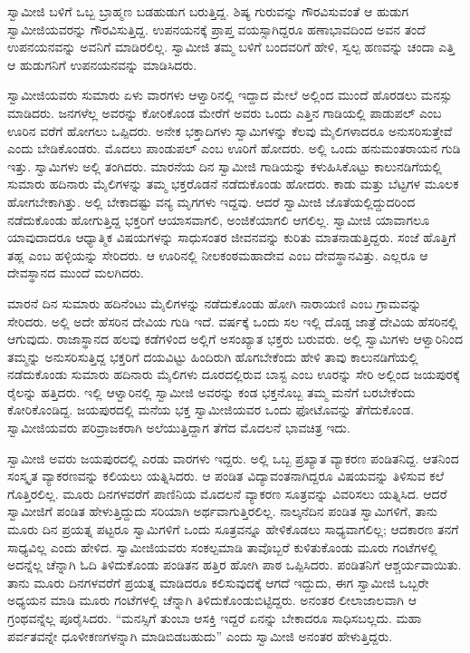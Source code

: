  ಸ್ವಾಮೀಜಿ ಬಳಿಗೆ ಒಬ್ಬ ಬ್ರಾಹ್ಮಣ ಬಡಹುಡುಗ ಬರುತ್ತಿದ್ದ. ಶಿಷ್ಯ ಗುರುವನ್ನು ಗೌರವಿಸುವಂತೆ ಆ ಹುಡುಗ ಸ್ವಾಮೀಜಿಯವರನ್ನು ಗೌರವಿಸುತ್ತಿದ್ದ. ಉಪನಯನಕ್ಕೆ ಪ್ರಾಪ್ತ ವಯಸ್ಸಾಗಿದ್ದರೂ ಹಣಾಭಾವದಿಂದ ಅವನ ತಂದೆ ಉಪನಯನವನ್ನು ಅವನಿಗೆ ಮಾಡಿರಲಿಲ್ಲ. ಸ್ವಾಮೀಜಿ ತಮ್ಮ ಬಳಿಗೆ ಬಂದವರಿಗೆ ಹೇಳಿ, ಸ್ವಲ್ಪ ಹಣವನ್ನು ಚಂದಾ ಎತ್ತಿ ಆ ಹುಡುಗನಿಗೆ ಉಪನಯನವನ್ನು ಮಾಡಿಸಿದರು. 

 ಸ್ವಾಮೀಜಿಯವರು ಸುಮಾರು ಏಳು ವಾರಗಳು ಆಳ್ವಾರಿನಲ್ಲಿ ಇದ್ದಾದ ಮೇಲೆ ಅಲ್ಲಿಂದ ಮುಂದೆ ಹೊರಡಲು ಮನಸ್ಸು ಮಾಡಿದರು. ಜನಗಳೆಲ್ಲ ಅವರನ್ನು ಕೋರಿಕೊಂಡ ಮೇರೆಗೆ ಅವರು ಒಂದು ಎತ್ತಿನ ಗಾಡಿಯಲ್ಲಿ ಪಾಡುಪಲ್ ಎಂಬ ಊರಿನ ವರೆಗೆ ಹೋಗಲು ಒಪ್ಪಿದರು. ಅನೇಕ ಭಕ್ತಾದಿಗಳು ಸ್ವಾಮಿಗಳನ್ನು ಕೆಲವು ಮೈಲಿಗಳಾದರೂ ಅನುಸರಿಸುತ್ತೇವೆ ಎಂದು ಬೇಡಿಕೊಂಡರು. ಮೊದಲು ಪಾಂಡುಪಲ್ ಎಂಬ ಊರಿಗೆ ಹೋದರು. ಅಲ್ಲಿ ಒಂದು ಹನುಮಂತರಾಯನ ಗುಡಿ ಇತ್ತು. ಸ್ವಾಮಿಗಳು ಅಲ್ಲಿ ತಂಗಿದರು. ಮಾರನೆಯ ದಿನ ಸ್ವಾಮೀಜಿ ಗಾಡಿಯನ್ನು ಕಳುಹಿಸಿಕೊಟ್ಟು ಕಾಲುನಡಿಗೆಯಲ್ಲಿ ಸುಮಾರು ಹದಿನಾರು ಮೈಲಿಗಳನ್ನು ತಮ್ಮ ಭಕ್ತರೊಡನೆ ನಡೆದುಕೊಂಡು ಹೋದರು. ಕಾಡು ಮತ್ತು ಬೆಟ್ಟಗಳ ಮೂಲಕ ಹೋಗಬೇಕಾಗಿತ್ತು. ಅಲ್ಲಿ ಬೇಕಾದಷ್ಟು ವನ್ಯ ಮೃಗಗಳು ಇದ್ದವು. ಆದರೆ ಸ್ವಾಮೀಜಿ ಜೊತೆಯಲ್ಲಿದ್ದುದರಿಂದ ನಡೆದುಕೊಂಡು ಹೋಗುತ್ತಿದ್ದ ಭಕ್ತರಿಗೆ ಆಯಾಸವಾಗಲಿ, ಅಂಜಿಕೆಯಾಗಲಿ ಆಗಲಿಲ್ಲ. ಸ್ವಾಮೀಜಿ ಯಾವಾಗಲೂ ಯಾವುದಾದರೂ ಆಧ್ಯಾತ್ಮಿಕ ವಿಷಯಗಳನ್ನು ಸಾಧುಸಂತರ ಜೀವನವನ್ನು ಕುರಿತು ಮಾತನಾಡುತ್ತಿದ್ದರು. ಸಂಜೆ ಹೊತ್ತಿಗೆ ತಹ್ಲ ಎಂಬ ಹಳ್ಳಿಯನ್ನು ಸೇರಿದರು. ಆ ಊರಿನಲ್ಲಿ ನೀಲಕಂಠಮಹಾದೇವ ಎಂಬ ದೇವಸ್ಥಾನವಿತ್ತು. ಎಲ್ಲರೂ ಆ ದೇವಸ್ಥಾನದ ಮುಂದೆ ಮಲಗಿದರು. 

 ಮಾರನೆ ದಿನ ಸುಮಾರು ಹದಿನೆಂಟು ಮೈಲಿಗಳನ್ನು ನಡೆದುಕೊಂಡು ಹೋಗಿ ನಾರಾಯಣಿ ಎಂಬ ಗ್ರಾಮವನ್ನು ಸೇರಿದರು. ಅಲ್ಲಿ ಅದೇ ಹೆಸರಿನ ದೇವಿಯ ಗುಡಿ ಇದೆ. ವರ್ಷಕ್ಕೆ ಒಂದು ಸಲ ಇಲ್ಲಿ ದೊಡ್ಡ ಜಾತ್ರೆ ದೇವಿಯ ಹೆಸರಿನಲ್ಲಿ ಆಗುವುದು. ರಾಜಾಸ್ಥಾನದ ಹಲವು ಕಡೆಗಳಿಂದ ಅಲ್ಲಿಗೆ ಅಸಂಖ್ಯಾತ ಭಕ್ತರು ಬರುವರು. ಅಲ್ಲಿ ಸ್ವಾಮಿಗಳು ಆಳ್ವಾರಿನಿಂದ ತಮ್ಮನ್ನು ಅನುಸರಿಸುತ್ತಿದ್ದ ಭಕ್ತರಿಗೆ ದಯವಿಟ್ಟು ಹಿಂದಿರುಗಿ ಹೊಗಬೇಕೆಂದು ಹೇಳಿ ತಾವು ಕಾಲುನಡಿಗೆಯಲ್ಲಿ ನಡೆದುಕೊಂಡು ಸುಮಾರು ಹದಿನಾರು ಮೈಲಿಗಳು ದೂರದಲ್ಲಿರುವ ಬಾಸ್ಟ ಎಂಬ ಊರನ್ನು ಸೇರಿ ಅಲ್ಲಿಂದ ಜಯಪುರಕ್ಕೆ ರೈಲನ್ನು ಹತ್ತಿದರು. ಇಲ್ಲಿ ಆಳ್ವಾರಿನಲ್ಲಿ ಸ್ವಾಮೀಜಿ ಅವರನ್ನು ಕಂಡ ಭಕ್ತನೊಬ್ಬ ತಮ್ಮ ಮನೆಗೆ ಬರಬೇಕೆಂದು ಕೋರಿಕೊಂಡಿದ್ದ. ಜಯಪುರದಲ್ಲಿ ಮನೆಯ ಭಕ್ತ ಸ್ವಾಮೀಜಿಯವರ ಒಂದು ಫೋಟೊವನ್ನು ತೆಗೆದುಕೊಂಡ. ಸ್ವಾಮೀಜಿಯವರು ಪರಿವ್ರಾಜಕರಾಗಿ ಅಲೆಯುತ್ತಿದ್ದಾಗ ತೆಗೆದ ಮೊದಲನೆ ಭಾವಚಿತ್ರ ಇದು. 

 ಸ್ವಾಮೀಜಿ ಅವರು ಜಯಪುರದಲ್ಲಿ ಎರಡು ವಾರಗಳು ಇದ್ದರು. ಅಲ್ಲಿ ಒಬ್ಬ ಪ್ರಖ್ಯಾತ ವ್ಯಾಕರಣ ಪಂಡಿತನಿದ್ದ. ಆತನಿಂದ ಸಂಸ್ಕೃತ ವ್ಯಾಕರಣವನ್ನು ಕಲಿಯಲು ಯತ್ನಿಸಿದರು. ಆ ಪಂಡಿತ ವಿದ್ಯಾವಂತನಾಗಿದ್ದರೂ ವಿಷಯವನ್ನು ತಿಳಿಸುವ ಕಲೆ ಗೊತ್ತಿರಲಿಲ್ಲ. ಮೂರು ದಿನಗಳವರೆಗೆ ಪಾಣಿನಿಯ ಮೊದಲನೆ ವ್ಯಾಕರಣ ಸೂತ್ರವನ್ನು ವಿವರಿಸಲು ಯತ್ನಿಸಿದ. ಆದರೆ ಸ್ವಾಮೀಜಿಗೆ ಪಂಡಿತ ಹೇಳುತ್ತಿದ್ದುದು ಸರಿಯಾಗಿ ಅರ್ಥವಾಗುತ್ತಿರಲಿಲ್ಲ. ನಾಲ್ಕನೆದಿನ ಪಂಡಿತ ಸ್ವಾಮಿಗಳಿಗೆ, ತಾನು ಮೂರು ದಿನ ಪ್ರಯತ್ನ ಪಟ್ಟರೂ ಸ್ವಾಮಿಗಳಿಗೆ ಒಂದು ಸೂತ್ರವನ್ನೂ ಹೇಳಿಕೊಡಲು ಸಾಧ್ಯವಾಗಲಿಲ್ಲ; ಆದಕಾರಣ ತನಗೆ ಸಾಧ್ಯವಿಲ್ಲ ಎಂದು ಹೇಳಿದ. ಸ್ವಾಮೀಜಿಯವರು ಸಂಕಲ್ಪಮಾಡಿ ತಾವೊಬ್ಬರೆ ಕುಳಿತುಕೊಂಡು ಮೂರು ಗಂಟೆಗಳಲ್ಲಿ ಅದನ್ನೆಲ್ಲ ಚೆನ್ನಾಗಿ ಓದಿ ತಿಳಿದುಕೊಂಡು ಪಂಡಿತನ ಹತ್ತಿರ ಹೋಗಿ ಪಾಠ ಒಪ್ಪಿಸಿದರು. ಪಂಡಿತನಿಗೆ ಆಶ್ಚರ್ಯವಾಯಿತು. ತಾನು ಮೂರು ದಿನಗಳವರೆಗೆ ಪ್ರಯತ್ನ ಮಾಡಿದರೂ ಕಲಿಸುವುದಕ್ಕೆ ಆಗದೆ ಇದ್ದುದು, ಈಗ ಸ್ವಾಮೀಜಿ ಒಬ್ಬರೇ ಅಧ್ಯಯನ ಮಾಡಿ ಮೂರು ಗಂಟೆಗಳಲ್ಲಿ ಚೆನ್ನಾಗಿ ತಿಳಿದುಕೊಂಡುಬಿಟ್ಟಿದ್ದರು. ಅನಂತರ ಲೀಲಾಜಾಲವಾಗಿ ಆ ಗ್ರಂಥವನ್ನೆಲ್ಲ ಪೂರೈಸಿದರು. “ಮನಸ್ಸಿಗೆ ತುಂಬಾ ಆಸಕ್ತಿ ಇದ್ದರೆ ಏನನ್ನು ಬೇಕಾದರೂ ಸಾಧಿಸಬಲ್ಲದು. ಮಹಾ ಪರ್ವತವನ್ನೇ ಧೂಳೀಕಣಗಳನ್ನಾಗಿ ಮಾಡಿಬಿಡಬಹುದು” ಎಂದು ಸ್ವಾಮೀಜಿ ಅನಂತರ ಹೇಳುತ್ತಿದ್ದರು. 

